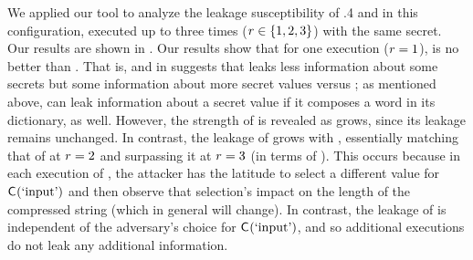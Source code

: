 We applied our tool to analyze the leakage susceptibility of
.4 and \smaz in this configuration, executed up to three
times ($r \in \{1, 2, 3\}$) with the same secret.  Our
results are shown in .  Our results show that for
one execution ($\roundNmbr=1$), \smaz is no better than \gzip.  That
is, \secretsSetSizeMax{} and \secretsSetSizeMax{} in
 suggests that \smaz leaks less information
about some secrets but some information about more secret values
versus \gzip; as mentioned above, \smaz can leak information about a
secret value if it composes a word in its dictionary, as well.
However, the strength of \smaz is revealed as \roundNmbr grows, since
its leakage remains unchanged. In contrast, the leakage of \gzip grows
with \roundNmbr, essentially matching that of \smaz at $r=2$
and surpassing it at $r=3$ (in terms of
\secretsSetSizeMin{}).  This occurs because in each execution of
\gzip, the attacker has the latitude to select a different value for
$\mathsf{C}_{}(\textrm{`input'})$ and then observe that selection's impact
on the length of the compressed string (which in general will change).
In contrast, the leakage of \smaz is independent of the adversary's
choice for $\mathsf{C}_{}(\textrm{`input'})$, and so additional executions
do not leak any additional information.
\iffalse
\zz{Another implicit factor
  impacting the leakage is the inputs domain or the dictionary used in
  the compression.  If limiting the range of inputs to `a', $\ldots$,
  `f', and `0', $\ldots$, `9', instead of all alphanumeric codes,
  \smaz starts to reveals lower leakage than \gzip at $\roundNmbr=1$,
  as the rows for `\gzip(hex)' and `\smaz(hex)' indicate}
\mkr{Why do we consider this case?  And why is it happening?}
\fi

